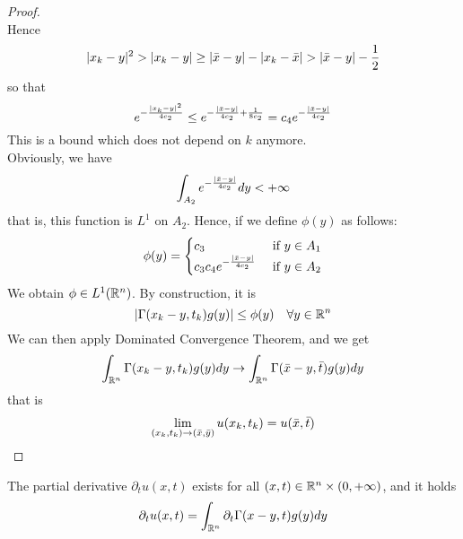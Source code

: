 \begin{ProofBox}
\begin{proof}
\begin{equation*}
    \end{equation*}
    Hence
    \begin{equation*}
        |x_k - y|^2 > |x_k - y| \geq |\Bar{x} - y| - |x_k - \Bar{x}| > |\Bar{x} - y| - \frac{1}{2}
    \end{equation*}
    so that 
    \begin{equation*}
        e^{-\frac{|x_k - y|^2}{4c_2}} \leq e^{-\frac{|\Bar{x}-y|}{4 c_2} + \frac{1}{8 c_2}} = c_4 e^{-\frac{|\Bar{x}-y|}{4 c_2}}
    \end{equation*}
    This is a bound which does not depend on $k$ anymore. \\
    Obviously, we have 
    \begin{equation*}
        \int_{A_2} e^{-\frac{|\Bar{x}-y|}{4 c_2}} dy < +\infty
    \end{equation*}
    that is, this function is $L^1$ on $A_2$.
    Hence, if we define $\phi(y)$ as follows:
    \begin{equation*}
    \phi(y)=
        \begin{cases}
        c_3 & \text{ if } y \in A_1\\
        c_3 c_4 e^{-\frac{|\Bar{x}-y|}{4 c_2}} & \text{ if } y \in A_2
        \end{cases}
    \end{equation*}
    We obtain $\phi \in L^1(\mathbb{R}^n)$. By construction, it is 
    \begin{equation*}
        |\Gamma(x_k-y,t_k)g(y)| \leq \phi(y) \quad \forall y \in \mathbb{R}^n
    \end{equation*}
    We can then apply Dominated Convergence Theorem, and we get 
    \begin{equation*}
        \int_{\mathbb{R}^n} \Gamma(x_k - y, t_k) g(y) dy \rightarrow \int_{\mathbb{R}^n} \Gamma(\Bar{x}-y, \Bar{t}) g(y) dy 
    \end{equation*}
    that is 
    \begin{equation*}
        \lim_{(x_k,t_k)\rightarrow (\Bar{x}, \Bar{y})} u(x_k,t_k) = u(\Bar{x}, \Bar{t})
    \end{equation*}
\end{proof}
\end{ProofBox}
\begin{PropBox}
    \begin{Lemma}[Lemma 2]
    \label{Lemma 2}
        The partial derivative $\partial_t u(x,t)$ exists for all $(x,t) \in \mathbb{R}^n \times (0,+\infty)$, and it holds 
        \begin{equation*}
            \partial_tu(x,t) = \int_{\mathbb{R}^n} \partial_t \Gamma(x-y,t) g(y)dy
        \end{equation*}
    \end{Lemma}
\end{PropBox}

